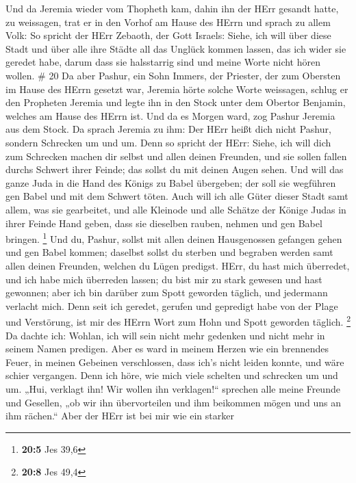  Und da Jeremia wieder vom Thopheth kam, dahin ihn der HErr
gesandt hatte, zu weissagen, trat er in den Vorhof am Hause des HErrn
und sprach zu allem Volk:  So spricht der HErr Zebaoth, der
Gott Israels: Siehe, ich will über diese Stadt und über alle ihre Städte
all das Unglück kommen lassen, das ich wider sie geredet habe, darum
dass sie halsstarrig sind und meine Worte nicht hören wollen. \# 20
 Da aber Pashur, ein Sohn Immers, der Priester, der zum
Obersten im Hause des HErrn gesetzt war, Jeremia hörte solche Worte
weissagen,  schlug er den Propheten Jeremia und legte ihn in
den Stock unter dem Obertor Benjamin, welches am Hause des HErrn ist.
 Und da es Morgen ward, zog Pashur Jeremia aus dem Stock. Da
sprach Jeremia zu ihm: Der HErr heißt dich nicht Pashur, sondern
Schrecken um und um.  Denn so spricht der HErr: Siehe, ich
will dich zum Schrecken machen dir selbst und allen deinen Freunden, und
sie sollen fallen durchs Schwert ihrer Feinde; das sollst du mit deinen
Augen sehen. Und will das ganze Juda in die Hand des Königs zu Babel
übergeben; der soll sie wegführen gen Babel und mit dem Schwert töten.
 Auch will ich alle Güter dieser Stadt samt allem, was sie
gearbeitet, und alle Kleinode und alle Schätze der Könige Judas in ihrer
Feinde Hand geben, dass sie dieselben rauben, nehmen und gen Babel
bringen. \footnote{\textbf{20:5} Jes 39,6}  Und du, Pashur,
sollst mit allen deinen Hausgenossen gefangen gehen und gen Babel
kommen; daselbst sollst du sterben und begraben werden samt allen deinen
Freunden, welchen du Lügen predigst.  HErr, du hast mich
überredet, und ich habe mich überreden lassen; du bist mir zu stark
gewesen und hast gewonnen; aber ich bin darüber zum Spott geworden
täglich, und jedermann verlacht mich.  Denn seit ich
geredet, gerufen und gepredigt habe von der Plage und Verstörung, ist
mir des HErrn Wort zum Hohn und Spott geworden täglich. \footnote{\textbf{20:8}
  Jes 49,4}  Da dachte ich: Wohlan, ich will sein nicht mehr
gedenken und nicht mehr in seinem Namen predigen. Aber es ward in meinem
Herzen wie ein brennendes Feuer, in meinen Gebeinen verschlossen, dass
ich's nicht leiden konnte, und wäre schier vergangen.  Denn
ich höre, wie mich viele schelten und schrecken um und um. „Hui,
verklagt ihn! Wir wollen ihn verklagen!{}`` sprechen alle meine Freunde
und Gesellen, „ob wir ihn übervorteilen und ihm beikommen mögen und uns
an ihm rächen.``  Aber der HErr ist bei mir wie ein starker
